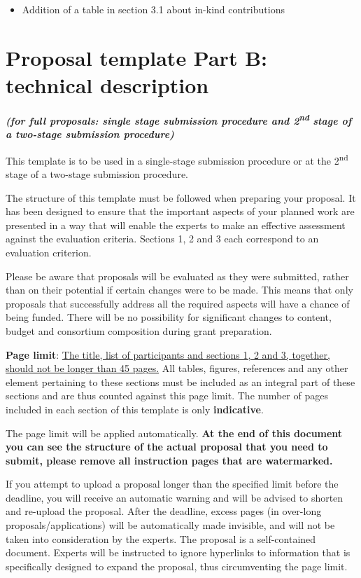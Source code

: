 \begin{itemize}
\item
  Addition of a table in section 3.1 about in-kind contributions
\end{itemize}

\section{Proposal template Part B: technical description}

\textbf{\emph{(for full proposals: single stage submission procedure and
2}\emph{\textsuperscript{nd}}\emph{ stage of a two-stage submission
procedure)}}

This template is to be used in a single-stage submission procedure or at
the 2\textsuperscript{nd} stage of a two-stage submission procedure.

The structure of this template must be followed when preparing your
proposal. It has been designed to ensure that the important aspects of
your planned work are presented in a way that will enable the experts to
make an effective assessment against the evaluation criteria. Sections
1, 2 and 3 each correspond to an evaluation criterion.

Please be aware that proposals will be evaluated as they were submitted,
rather than on their potential if certain changes were to be made. This
means that only proposals that successfully address all the required
aspects will have a chance of being funded. There will be no possibility
for significant changes to content, budget and consortium composition
during grant preparation.

\textbf{ Page limit}: \uline{The title, list of participants and
sections 1, 2 and 3, together, should not be longer than 45 pages.} All
tables, figures, references and any other element pertaining to these
sections must be included as an integral part of these sections and are
thus counted against this page limit. The number of pages included in
each section of this template is only \textbf{indicative}.

The page limit will be applied automatically. \textbf{At the end of this
document you can see the structure of the actual proposal that you need
to submit, please remove all instruction pages that are watermarked. }

If you attempt to upload a proposal longer than the specified limit
before the deadline, you will receive an automatic warning and will be
advised to shorten and re-upload the proposal. After the deadline,
excess pages (in over-long proposals/applications) will be automatically
made invisible, and will not be taken into consideration by the experts.
The proposal is a self-contained document. Experts will be instructed to
ignore hyperlinks to information that is specifically designed to expand
the proposal, thus circumventing the page limit.

